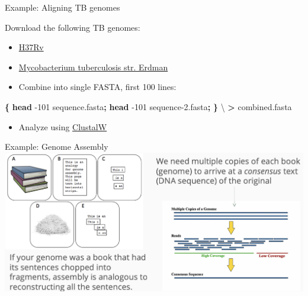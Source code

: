 \documentclass[
  ignorenonframetext,
]{beamer}
\newenvironment{Shaded}{\begin{snugshade}}{\end{snugshade}}
\newcommand{\AttributeTok}[1]{\textcolor[rgb]{0.13,0.29,0.53}{#1}}
\newcommand{\DataTypeTok}[1]{\textcolor[rgb]{0.13,0.29,0.53}{#1}}
\newcommand{\FunctionTok}[1]{\textcolor[rgb]{0.13,0.29,0.53}{\textbf{#1}}}
\newcommand{\KeywordTok}[1]{\textcolor[rgb]{0.13,0.29,0.53}{\textbf{#1}}}
\newcommand{\NormalTok}[1]{#1}
\newcommand{\OperatorTok}[1]{\textcolor[rgb]{0.81,0.36,0.00}{\textbf{#1}}}
\providecommand{\tightlist}{%
  \setlength{\itemsep}{0pt}\setlength{\parskip}{0pt}}
\begin{document}
\begin{frame}[fragile]{Example: Aligning TB genomes}
\label{example-aligning-tb-genomes}
\Large

Download the following TB genomes:

\begin{itemize}
\tightlist
\item
  \href{https://www.ncbi.nlm.nih.gov/nuccore/NC_000962.3?report=fasta}{H37Rv}
\item
  \href{https://www.ncbi.nlm.nih.gov/nuccore/AP012340.1?report=fasta}{Mycobacterium
  tuberculosis str. Erdman}
\item
  Combine into single FASTA, first 100 lines:
\end{itemize}

\normalsize

\begin{Shaded}
\begin{Highlighting}[]
\KeywordTok{\{} \FunctionTok{head} \AttributeTok{{-}101}\NormalTok{ sequence.fasta}\KeywordTok{;} \FunctionTok{head} \AttributeTok{{-}101}\NormalTok{ sequence{-}2.fasta}\KeywordTok{;} \KeywordTok{\}} \DataTypeTok{\textbackslash{}}
\OperatorTok{\textgreater{}}\NormalTok{ combined.fasta}
\end{Highlighting}
\end{Shaded}

\Large

\begin{itemize}
\tightlist
\item
  Analyze using
  \href{https://www.genome.jp/tools-bin/clustalw}{ClustalW}
\end{itemize}
\end{frame}

\begin{frame}{Example: Genome Assembly}
\label{example-genome-assembly}
\includegraphics{figs/assembly.png}
\end{frame}
\end{document}
